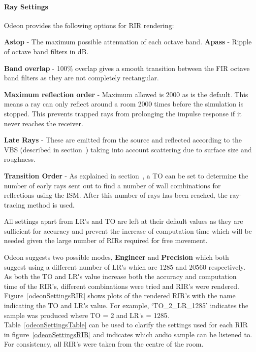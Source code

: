 \documentclass[../../main.tex]{subfiles}
\begin{document}
			\paragraph{Ray Settings}

				Odeon provides the following options for \ac{RIR} rendering:

				\textbf{Astop} - The maximum possible attenuation of each octave band.
				\textbf{Apass} - Ripple of octave band filters in dB.

				\textbf{Band overlap} - 100\% overlap gives a smooth transition between the FIR octave band filters as they are not completely rectangular.

				\textbf{Maximum reflection order} - Maximum allowed is 2000 as is the default. This means a ray can only reflect around a room 2000 times before the simulation is stopped. This prevents trapped rays from prolonging the impulse response if it never reaches the receiver.

				\textbf{Late Rays} - These are emitted from the source and reflected according to the \ac{VBS} (described in section~) taking into account scattering due to surface size and roughness.

				\textbf{Transition Order} - As explained in section~, a \ac{TO} can be set to determine the number of early rays sent out to find a number of wall combinations for reflections using the \ac{ISM}. After this number of rays has been reached, the ray-tracing method is used.

				All settings apart from \ac{LR's} and \ac{TO} are left at their default values as they are sufficient for accuracy and prevent the increase of computation time which will be needed given the large number of RIRs required for free movement.

				Odeon suggests two possible modes, \textbf{Engineer} and \textbf{Precision} which both suggest using a different number of \ac{LR's} which are 1285 and 20560 respectively. As both the \ac{TO} and \ac{LR's} value increase both the accuracy and computation time of the \ac{RIR}'s, different combinations were tried and \ac{RIR}'s were rendered. Figure~\ref{odeonSettingsRIR} shows plots of the rendered \ac{RIR}'s with the name indicating the \ac{TO} and \ac{LR's} value. For example, `TO\_2\_LR\_1285' indicates the sample was produced where \ac{TO} = 2 and \ac{LR's} = 1285. Table~\ref{odeonSettingsTable} can be used to clarify the settings used for each \ac{RIR} in figure~\ref{odeonSettingsRIR} and indicates which audio sample can be listened to. For consistency, all \ac{RIR}'s were taken from the centre of the room.
\end{document}
